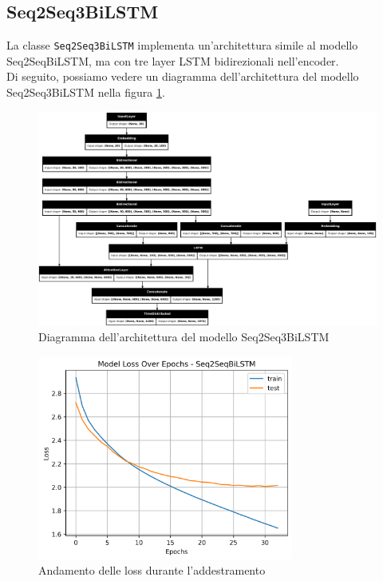 \subsection{Seq2Seq3BiLSTM}
La classe \texttt{Seq2Seq3BiLSTM} implementa un'architettura simile al modello Seq2SeqBiLSTM, ma con tre layer LSTM bidirezionali nell'encoder.\\
Di seguito, possiamo vedere un diagramma dell'architettura del modello Seq2Seq3BiLSTM nella figura \ref{fig:seq2seq3bilstm_model_architecture}.
\begin{figure}[H]
    \centering
    \includegraphics[width=1\textwidth]{media/Seq2Seq3BiLSTM_image.png}
    \caption{Diagramma dell'architettura del modello Seq2Seq3BiLSTM}
    \label{fig:seq2seq3bilstm_model_architecture}
\end{figure}


\begin{figure}[H]
    \centering
    \includegraphics[width=0.75\textwidth]{media/Seq2Seq3BiLSTM_originale_lossplot.png}
    \caption{Andamento delle loss durante l'addestramento}
    \label{fig:seq2seq3bilstm_loss_plot}
\end{figure}

